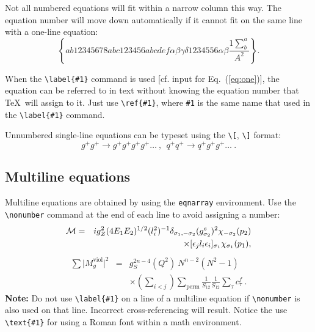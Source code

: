 \documentclass[%
 aapm,
 mph,%
 amsmath,amssymb,
 reprint,%
]{revtex4-2}
\begin{document}
Not all numbered equations will fit within a narrow column this
way. The equation number will move down automatically if it cannot fit
on the same line with a one-line equation:
\begin{equation}
\left\{
 ab12345678abc123456abcdef\alpha\beta\gamma\delta1234556\alpha\beta
 \frac{1\sum^{a}_{b}}{A^2}%
\right\}.
\end{equation}

When the \verb+\label{#1}+ command is used [cf. input for
Eq.~(\ref{eq:one})], the equation can be referred to in text without
knowing the equation number that \TeX\ will assign to it. Just
use \verb+\ref{#1}+, where \verb+#1+ is the same name that used in
the \verb+\label{#1}+ command.

Unnumbered single-line equations can be typeset
using the \verb+\[+, \verb+\]+ format:
\[g^+g^+ \rightarrow g^+g^+g^+g^+ \dots ~,~~q^+q^+\rightarrow
q^+g^+g^+ \dots ~. \]

\subsection{Multiline equations}

Multiline equations are obtained by using the \verb+eqnarray+
environment.  Use the \verb+\nonumber+ command at the end of each line
to avoid assigning a number:
\begin{eqnarray}
{\cal M}=&&ig_Z^2(4E_1E_2)^{1/2}(l_i^2)^{-1}
\delta_{\sigma_1,-\sigma_2}
(g_{\sigma_2}^e)^2\chi_{-\sigma_2}(p_2)\nonumber\\
&&\times
[\epsilon_jl_i\epsilon_i]_{\sigma_1}\chi_{\sigma_1}(p_1),
\end{eqnarray}
\begin{eqnarray}
\sum \vert M^{\text{viol}}_g \vert ^2&=&g^{2n-4}_S(Q^2)~N^{n-2}
        (N^2-1)\nonumber \\
 & &\times \left( \sum_{i<j}\right)
  \sum_{\text{perm}}
 \frac{1}{S_{12}}
 \frac{1}{S_{12}}
 \sum_\tau c^f_\tau~.
\end{eqnarray}
\textbf{Note:} Do not use \verb+\label{#1}+ on a line of a multiline
equation if \verb+\nonumber+ is also used on that line. Incorrect
cross-referencing will result. Notice the use \verb+\text{#1}+ for
using a Roman font within a math environment.
\end{document}
